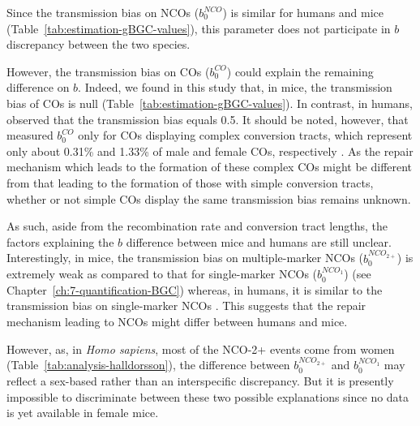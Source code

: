 \begin{mccorrection}

Since the transmission bias on NCOs ($b_0^{NCO}$) is similar for humans and mice (Table~\ref{tab:estimation-gBGC-values}), this parameter does not participate in $b$ discrepancy between the two species.

However, the transmission bias on COs ($b_0^{CO}$) could explain the remaining difference on $b$.
Indeed, we found in this study that, in mice, the transmission bias of COs is null (Table~\ref{tab:estimation-gBGC-values}).
In contrast, in humans, \citet{halldorsson2016rate} observed that the transmission bias equals 0.5.
It should be noted, however, that \citet{halldorsson2016rate} measured $b_0^{CO}$ only for COs displaying complex conversion tracts, which represent only about 0.31\% and 1.33\% of male and female COs, respectively \citep{webb2008sperm, halldorsson2016rate}.
As the repair mechanism which leads to the formation of these complex COs might be different from that leading to the formation of those with simple conversion tracts, whether or not simple COs display the same transmission bias remains unknown.

As such, aside from the recombination rate and conversion tract lengths, the factors explaining the $b$ difference between mice and humans are still unclear.\\

Interestingly, in mice, the transmission bias on multiple-marker NCOs ($b_0^{NCO_{2+}}$) is extremely weak as compared to that for single-marker NCOs ($b_0^{NCO_{1}}$) (see Chapter~\ref{ch:7-quantification-BGC}) whereas, in humans, it is similar to the transmission bias on single-marker NCOs \citep{halldorsson2016rate}.
This suggests that the repair mechanism leading to NCOs might differ between humans and mice.

However, as, in \textit{Homo sapiens}, most of the NCO-2+ events come from women (Table~\ref{tab:analysis-halldorsson}), the difference between $b_0^{NCO_{2+}}$ and $b_0^{NCO_{1}}$ may reflect a sex-based rather than an interspecific discrepancy.
But it is presently impossible to discriminate between these two possible explanations since no data is yet available in female mice.



\end{mccorrection}



